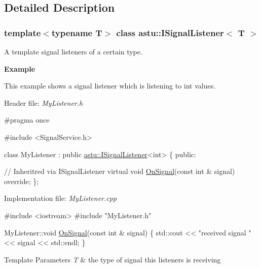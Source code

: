 \subsection{Detailed Description}
\subsubsection*{template$<$typename T$>$\newline
class astu\+::\+I\+Signal\+Listener$<$ T $>$}

A template signal listeners of a certain type.

{\bfseries Example}

This example shows a signal listener which is listening to {\ttfamily int} values.

Header file\+: {\itshape My\+Listener.\+h} 
\begin{DoxyCode}
\textcolor{preprocessor}{#pragma once}

\textcolor{preprocessor}{#include <SignalService.h>}

\textcolor{keyword}{class }MyListener : \textcolor{keyword}{public} \hyperlink{classastu_1_1ISignalListener}{astu::ISignalListener}<int> \{
\textcolor{keyword}{public}:

  \textcolor{comment}{// Inheritred via ISignalListener}
  \textcolor{keyword}{virtual} \textcolor{keywordtype}{void} \hyperlink{classastu_1_1ISignalListener_a2ae8168f23b6daa3416f6e5995fd5d31}{OnSignal}(\textcolor{keyword}{const} \textcolor{keywordtype}{int} & signal) \textcolor{keyword}{override};    
\};
\end{DoxyCode}


Implementation file\+: {\itshape My\+Listener.\+cpp}


\begin{DoxyCode}
\textcolor{preprocessor}{#include <iostream>}
\textcolor{preprocessor}{#include "MyListener.h"}

MyListener::void \hyperlink{classastu_1_1ISignalListener_a2ae8168f23b6daa3416f6e5995fd5d31}{OnSignal}(\textcolor{keyword}{const} \textcolor{keywordtype}{int} & signal)
\{
  std::cout << \textcolor{stringliteral}{"received signal "} << signal << std::endl;
\}    
\end{DoxyCode}



\begin{DoxyTemplParams}{Template Parameters}
{\em T} & the type of signal this listeners is receiving \\
\hline
\end{DoxyTemplParams}


